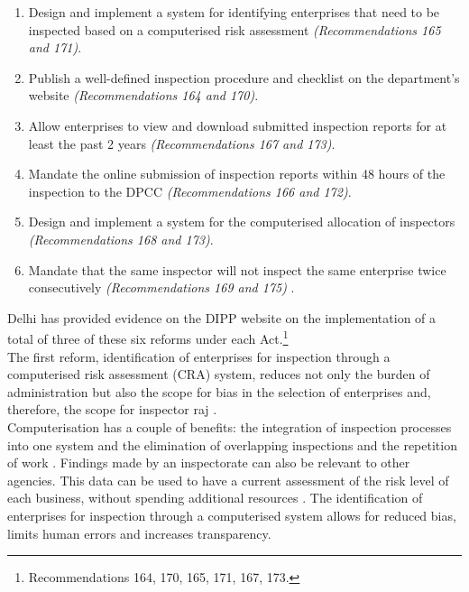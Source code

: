 \documentclass[a4paper, 12pt]{article}
\begin{document}
                 \begin{enumerate}
                 \item Design and implement a system for identifying enterprises that need to be inspected based on a computerised risk assessment \textit{(Recommendations 165 and 171)}.
                 \item Publish a well-defined inspection procedure and checklist on the department’s website \textit{(Recommendations 164 and 170)}.
                 \item Allow enterprises to view and download submitted inspection reports for at least the past 2 years \textit{(Recommendations 167 and 173)}.
                 \item Mandate the online submission of inspection reports within 48 hours of the inspection to the DPCC \textit{(Recommendations 166 and 172)}.
                 \item Design and implement a system for the computerised allocation of inspectors \textit{(Recommendations 168 and 173)}.
                 \item Mandate that the same inspector will not inspect the same enterprise twice consecutively \textit{(Recommendations 169 and 175)} \parencite{DIPPa}.
                 \end{enumerate}
                 
                 Delhi has provided evidence on the DIPP website on the implementation of a total of three of these six reforms under each Act.\footnote{Recommendations 164, 170, 165, 171, 167, 173.} \\
                 
                 The first reform, identification of enterprises for inspection through a computerised risk assessment (CRA) system, reduces not only the burden of administration \parencite{DIPPd} but also the scope for bias in the selection of enterprises and, therefore, the scope for inspector raj \parencite{livemintnews}. \\
                 
                 Computerisation has a couple of benefits: the integration of inspection processes into one system and the elimination of overlapping inspections and the repetition of work \parencite{PWC}. Findings made by an inspectorate can also be relevant to other agencies. This data can be used to have a current assessment of the risk level of each business, without spending additional resources \parencite{OECD14}. The identification of enterprises for inspection through a computerised system allows for reduced bias, limits human errors and increases transparency. \\
                 
\end{document}
